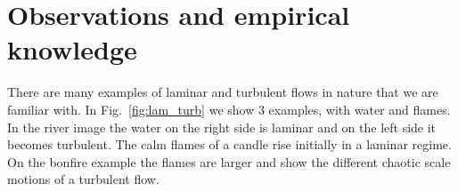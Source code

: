 \graphicspath{{imgs/} {imgs/lam_turb} {imgs/spec}}

\section{Observations and empirical knowledge}

There are many examples of laminar and turbulent flows in nature that we are familiar with. In Fig.~\ref{fig:lam_turb} we show 3 examples, with water and flames. In the river image the water on the right side is laminar and on the left side it becomes turbulent. The calm flames of a candle rise initially in a laminar regime. On the bonfire example the flames are larger and show the different chaotic scale motions of a turbulent flow.

\begin{figure}[h!]
\centering


\end{figure}
